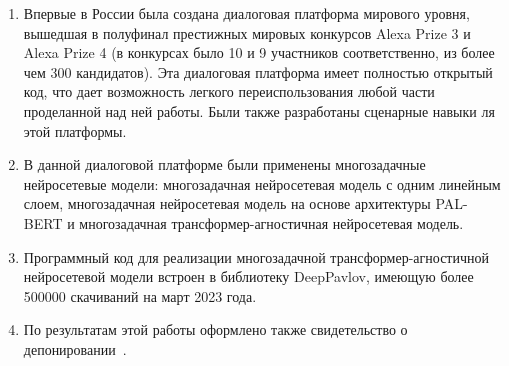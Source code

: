 \iffalse
Направления исследований 1.2.2:
1. Разработка новых математических методов моделирования объектов и
явлений (физико-математические науки).
2. Разработка, обоснование и тестирование эффективных вычислительных
методов с применением современных компьютерных технологий.
3. Реализация эффективных численных методов и алгоритмов в виде
комплексов проблемно-ориентированных программ для проведения
вычислительного эксперимента.
4. Разработка новых математических методов и алгоритмов интерпретации
натурного эксперимента на основе его математической модели.
5. Разработка новых математических методов и алгоритмов валидации
математических моделей объектов на основе данных натурного эксперимента
или на основе анализа математических моделей.
6. Разработка систем компьютерного и имитационного моделирования,
алгоритмов и методов имитационного моделирования на основе анализа
математических моделей (технические науки).
7. Качественные или аналитические методы исследования математических
моделей (технические науки).
8. Комплексные исследования научных и технических проблем с
применением современной технологии математического моделирования и
вычислительного эксперимента.
9. Постановка и проведение численных экспериментов, статистический
анализ их результатов, в том числе с применением современных
компьютерных технологий (технические науки).
\fi


{\influence}
\begin{enumerate}
   \item Впервые в России была создана диалоговая платформа мирового уровня, вышедшая в полуфинал престижных мировых конкурсов Alexa Prize 3 и Alexa Prize 4 (в конкурсах было 10 и 9 участников соответственно, из более чем 300 кандидатов). Эта диалоговая платформа имеет полностью открытый код, что дает возможность легкого переиспользования любой части проделанной над ней работы. Были также разработаны сценарные навыки ля этой платформы.
   \item В данной диалоговой платформе были применены многозадачные нейросетевые модели: многозадачная нейросетевая модель с одним линейным слоем, многозадачная нейросетевая модель на основе архитектуры PAL-BERT и многозадачная трансформер-агностичная нейросетевая модель. 
   \item Программный код для реализации многозадачной трансформер-агностичной нейросетевой модели встроен в библиотеку DeepPavlov, имеющую более 500000 скачиваний на март 2023 года.
   \item По результатам этой работы оформлено также свидетельство о депонировании~\cite{Дуплякин_Дмитрий_Ондар_Ушаков_2021}. %
\end{enumerate}


